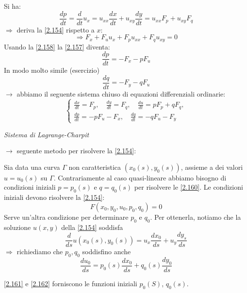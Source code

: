 \documentclass[a4paper,11pt]{report}
\begin{document}
Si ha:
\begin{equation}
\frac{dp}{dt}=\frac{d}{dt}u_x = u_{xx}\frac{dx}{dt} + u_{xy}\frac{dy}{dt}=u_{xx}F_p + u_{xy}F_q
\label{2.157}
\end{equation}
$\Rightarrow$ deriva la \eqref{2.154} rispetto a $x$:
\begin{equation}
\Rightarrow F_x + F_u u_x + F_p u_{xx} + F_q u_{xy}=0
\label{2.158}
\end{equation}
Usando la \eqref{2.158} la \eqref{2.157} diventa:
\begin{equation}
\frac{dp}{dt}=-F_x - p F_u
\label{2.159}
\end{equation}
In modo molto simile (esercizio)
\begin{equation}
\frac{dq}{dt}=-F_y - qF_u 
\label{2.159'}
\tag{$\theequation^\prime$}
\end{equation}
$\rightarrow$ abbiamo il seguente sistema chiuso di equazioni differenziali ordinarie:
\begin{equation}
\begin{cases}
\frac{dx}{dt}= F_p,\quad \frac{dy}{dt}=F_q, \quad \frac{du}{dt}=pF_p + qF_q,\\
\frac{dp}{dt}= - p F_u - F_x, \quad \frac{dq}{dt}=-q F_u - F_y 
\end{cases}
\label{2.160}
\end{equation}
\centerline{\emph{Sistema di Lagrange-Charpit}}

$\rightarrow$ seguente metodo per risolvere la \eqref{2.154}:

Sia data una curva $\Gamma$ non caratteristica $(x_0(s),y_0(s))$, assieme a dei valori $u=u_0(s)$ su $\Gamma$.
Contrariamente al caso quasi-lineare abbiamo bisogno di condizioni iniziali $p=p_0(s)$ e $q=q_0(s)$ per risolvere le \eqref{2.160}. Le condizioni iniziali devono risolvere la \eqref{2.154}: 
\begin{equation}
F(x_0,y_0,u_0,p_0,q_0)=0 
\label{2.161}
\end{equation}
Serve un'altra condizione per determinare $p_0$ e $q_0$.
Per ottenerla, notiamo che la soluzione $u(x,y)$ della \eqref{2.154} soddisfa 
\[
\frac{d}{ds}u(x_0(s), y_0(s))=u_x\frac{dx_0}{ds}+u_y\frac{dy_s}{ds}
\]
$\Rightarrow$ richiediamo che $p_0, q_0$ soddisfino anche
\begin{equation}
\frac{du_0}{ds}=p_0(s)\frac{dx_0}{ds}+ q_0(s)\frac{dy_0}{ds}
\label{2.162}
\end{equation}

\eqref{2.161} e \eqref{2.162} forniscono le funzioni iniziali $p_0(S)$, $q_0(s)$.
\end{document}
